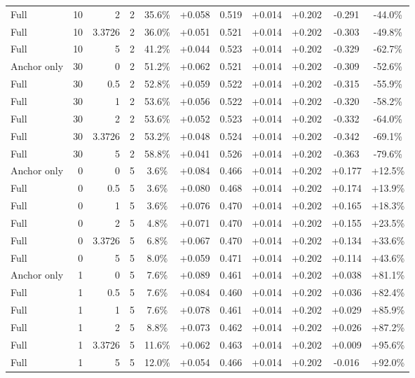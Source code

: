 \begin{table}[htbp]
\begin{tabular}{lrrrccccccc}
Full & 10 & 2 & 2 & 35.6\% & +0.058 & 0.519 & +0.014 & +0.202 & -0.291 & -44.0\% \\
Full & 10 & 3.3726 & 2 & 36.0\% & +0.051 & 0.521 & +0.014 & +0.202 & -0.303 & -49.8\% \\
Full & 10 & 5 & 2 & 41.2\% & +0.044 & 0.523 & +0.014 & +0.202 & -0.329 & -62.7\% \\
Anchor only & 30 & 0 & 2 & 51.2\% & +0.062 & 0.521 & +0.014 & +0.202 & -0.309 & -52.6\% \\
Full & 30 & 0.5 & 2 & 52.8\% & +0.059 & 0.522 & +0.014 & +0.202 & -0.315 & -55.9\% \\
Full & 30 & 1 & 2 & 53.6\% & +0.056 & 0.522 & +0.014 & +0.202 & -0.320 & -58.2\% \\
Full & 30 & 2 & 2 & 53.6\% & +0.052 & 0.523 & +0.014 & +0.202 & -0.332 & -64.0\% \\
Full & 30 & 3.3726 & 2 & 53.2\% & +0.048 & 0.524 & +0.014 & +0.202 & -0.342 & -69.1\% \\
Full & 30 & 5 & 2 & 58.8\% & +0.041 & 0.526 & +0.014 & +0.202 & -0.363 & -79.6\% \\
Anchor only & 0 & 0 & 5 & 3.6\% & +0.084 & 0.466 & +0.014 & +0.202 & +0.177 & +12.5\% \\
Full & 0 & 0.5 & 5 & 3.6\% & +0.080 & 0.468 & +0.014 & +0.202 & +0.174 & +13.9\% \\
Full & 0 & 1 & 5 & 3.6\% & +0.076 & 0.470 & +0.014 & +0.202 & +0.165 & +18.3\% \\
Full & 0 & 2 & 5 & 4.8\% & +0.071 & 0.470 & +0.014 & +0.202 & +0.155 & +23.5\% \\
Full & 0 & 3.3726 & 5 & 6.8\% & +0.067 & 0.470 & +0.014 & +0.202 & +0.134 & +33.6\% \\
Full & 0 & 5 & 5 & 8.0\% & +0.059 & 0.471 & +0.014 & +0.202 & +0.114 & +43.6\% \\
Anchor only & 1 & 0 & 5 & 7.6\% & +0.089 & 0.461 & +0.014 & +0.202 & +0.038 & +81.1\% \\
Full & 1 & 0.5 & 5 & 7.6\% & +0.084 & 0.460 & +0.014 & +0.202 & +0.036 & +82.4\% \\
Full & 1 & 1 & 5 & 7.6\% & +0.078 & 0.461 & +0.014 & +0.202 & +0.029 & +85.9\% \\
Full & 1 & 2 & 5 & 8.8\% & +0.073 & 0.462 & +0.014 & +0.202 & +0.026 & +87.2\% \\
Full & 1 & 3.3726 & 5 & 11.6\% & +0.062 & 0.463 & +0.014 & +0.202 & +0.009 & +95.6\% \\
Full & 1 & 5 & 5 & 12.0\% & +0.054 & 0.466 & +0.014 & +0.202 & -0.016 & +92.0\% \\

\end{tabular}
\end{table}
